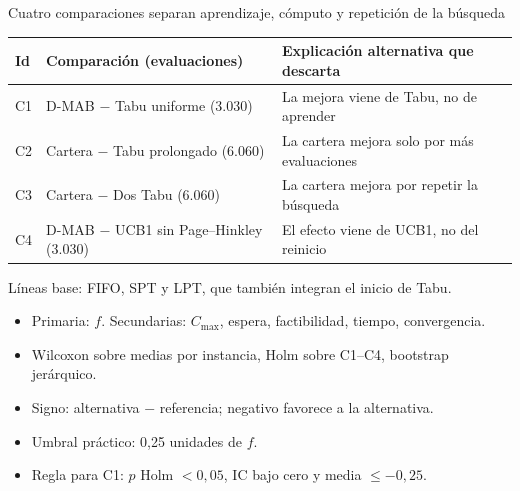 \documentclass[aspectratio=169,11pt]{beamer}
\begin{document}
\begin{frame}{Cuatro comparaciones separan aprendizaje, cómputo y repetición de la búsqueda}
  \centering\footnotesize
  \begin{tabular}{@{}lll@{}}
    \toprule
    Id & Comparación (evaluaciones) & Explicación alternativa que descarta\\
    \midrule
    C1 & D-MAB $-$ Tabu uniforme (3.030) & La mejora viene de Tabu, no de aprender\\
    C2 & Cartera $-$ Tabu prolongado (6.060) & La cartera mejora solo por más evaluaciones\\
    C3 & Cartera $-$ Dos Tabu (6.060) & La cartera mejora por repetir la búsqueda\\
    C4 & D-MAB $-$ UCB1 sin Page--Hinkley (3.030) & El efecto viene de UCB1, no del reinicio\\
    \bottomrule
  \end{tabular}

  \vspace{0.05cm}
  {\scriptsize\color{gris} Líneas base: FIFO, SPT y LPT, que también integran el inicio de Tabu.\par}
  \vspace{0.12cm}
  \raggedright\normalsize
  \begin{itemize}
    \item Primaria: $f$. Secundarias: $C_{\max}$, espera, factibilidad, tiempo, convergencia.
    \item Wilcoxon sobre medias por instancia, Holm sobre C1--C4, bootstrap jerárquico.
    \item Signo: alternativa $-$ referencia; negativo favorece a la alternativa.
    \item Umbral práctico: 0,25 unidades de $f$.
    \item Regla para C1: $p$ Holm $<0{,}05$, IC bajo cero y media $\le -0{,}25$.
  \end{itemize}
\end{frame}
\end{document}
